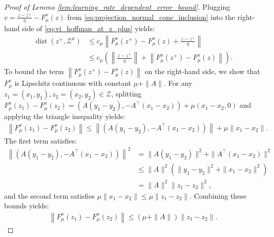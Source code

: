 \documentclass{article}
\DeclareMathOperator{\dist}{dist}
\newcommand{\Z}{\mathcal{Z}}
\theoremstyle{plain}
\begin{document}
\begin{proof}[Proof of Lemma \ref{lem:learning_rate_dependent_error_bound}]
    Plugging $v = \frac{z - z^+}{\eta} - F_{\mu}^x(z)$ from \eqref{eq:projection_normal_cone_inclusion} into the right-hand side of \eqref{eq:vi_hoffman_at_z_plus} yields:
    \begin{align}
        \dist(z^+, \Z^{\mu}) & \leq c_{\mu} \left\|F_{\mu}^x(z^+) - F_{\mu}^x(z) + \frac{z - z^+}{\eta}\right\| \nonumber                    \\
        & \leq c_{\mu} \left(\left\|\frac{z - z^+}{\eta}\right\| + \left\|F_{\mu}^x(z^+) - F_{\mu}^x(z)\right\|\right).
        \label{eq:dist_z_plus_decomposition}
    \end{align}
    To bound the term $\left\|F_{\mu}^x(z^+) - F_{\mu}^x(z)\right\|$ on the right-hand side, we show that $F_{\mu}^x$ is Lipschitz continuous with constant $\mu + \|A\|$.
    For any $z_1 = (x_1, y_1), z_2 = (x_2, y_2)\in \Z$, splitting $F_{\mu}^x(z_1) - F_{\mu}^x(z_2) = \left(A(y_1 - y_2), -A^{\top}(x_1 - x_2)\right) + \mu(x_1 - x_2, 0)$ and applying the triangle inequality yields:
    \begin{align*}
        \left\|F_{\mu}^x(z_1) - F_{\mu}^x(z_2)\right\| \leq \left\|\left(A(y_1 - y_2), -A^{\top}(x_1 - x_2)\right)\right\| + \mu\|x_1 - x_2\|.
    \end{align*}
    The first term satisfies:
    \begin{align*}
        \left\|\left(A(y_1 - y_2), -A^{\top}(x_1 - x_2)\right)\right\|^2 & = \|A(y_1 - y_2)\|^2 + \|A^{\top}(x_1 - x_2)\|^2           \\
        & \leq \|A\|^2\left(\|y_1 - y_2\|^2 + \|x_1 - x_2\|^2\right) \\
        & = \|A\|^2\|z_1 - z_2\|^2,
    \end{align*}
    and the second term satisfies $\mu\|x_1 - x_2\| \leq \mu\|z_1 - z_2\|$.
    Combining these bounds yields:
    \begin{align}
        \left\|F_{\mu}^x(z_1) - F_{\mu}^x(z_2)\right\| \leq (\mu + \|A\|)\|z_1 - z_2\|.
        \label{eq:lipschitzness_of_F_mu}
    \end{align}


\end{proof}
\end{document}
